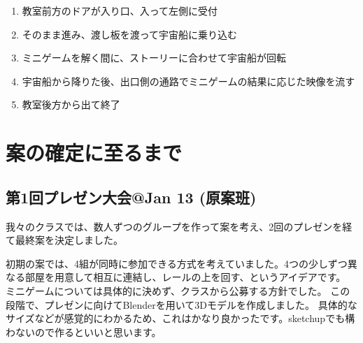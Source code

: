 \documentclass{jsarticle}
\begin{document}
\begin{enumerate}
    \item 教室前方のドアが入り口、入って左側に受付
    \item そのまま進み、渡し板を渡って宇宙船に乗り込む
    \item ミニゲームを解く間に、ストーリーに合わせて宇宙船が回転
    \item 宇宙船から降りた後、出口側の通路でミニゲームの結果に応じた映像を流す
    \item 教室後方から出て終了
\end{enumerate}

\clearpage

\section{案の確定に至るまで}

\subsection{第1回プレゼン大会@Jan 13 (原案班)}

我々のクラスでは、数人ずつのグループを作って案を考え、2回のプレゼンを経て最終案を決定しました。

初期の案では、4組が同時に参加できる方式を考えていました。4つの少しずつ異なる部屋を用意して相互に連結し、レールの上を回す、というアイデアです。
ミニゲームについては具体的に決めず、クラスから公募する方針でした。
この段階で、プレゼンに向けてBlenderを用いて3Dモデルを作成しました。
具体的なサイズなどが感覚的にわかるため、これはかなり良かったです。sketchupでも構わないので作るといいと思います。
\end{document}
